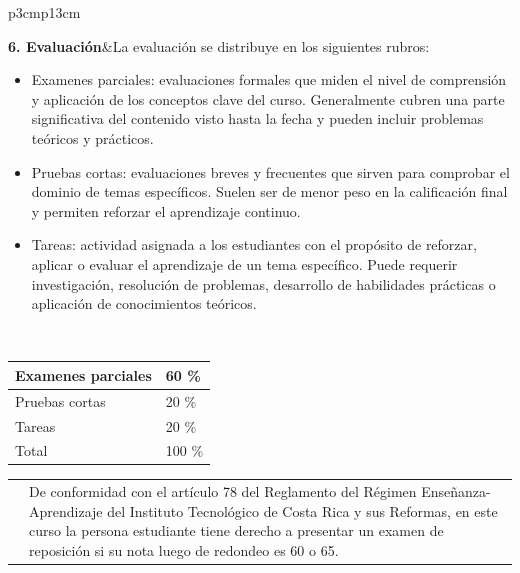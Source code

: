 \documentclass[letterpaper]{article}%
\begin{document}
\vspace*{2mm}%
\newline%
\begin{tabularx}{\textwidth}{p{3cm}p{13cm}}%
\par\fontsize{12}{14}\selectfont \textbf{\textcolor{parte}{6. Evaluación}}&La evaluación se distribuye en los siguientes rubros: \newline \begin{itemize} \item Examenes parciales: evaluaciones formales que miden el nivel de comprensión y aplicación de los conceptos clave del curso. Generalmente cubren una parte significativa del contenido visto hasta la fecha y pueden incluir problemas teóricos y prácticos. \item Pruebas cortas: evaluaciones breves y frecuentes que sirven para comprobar el dominio de temas específicos. Suelen ser de menor peso en la calificación final y permiten reforzar el aprendizaje continuo. \item Tareas: actividad asignada a los estudiantes con el propósito de reforzar, aplicar o evaluar el aprendizaje de un tema específico. Puede requerir investigación, resolución de problemas, desarrollo de habilidades prácticas o aplicación de conocimientos teóricos. \end{itemize}\\%
\end{tabularx}%
\vspace*{2mm}%
\newline%
 \begin{minipage}{\linewidth}  \centering  \begin{tabular}{ p{4cm}  p{1.5cm} }  \toprule  Examenes parciales & 60 \% \\  \midrule  Pruebas cortas & 20 \% \\  \midrule  Tareas & 20 \% \\  \midrule Total & 100 \% \\  \bottomrule  \end{tabular} \end{minipage}%
\vspace*{2mm}%
\newline%
\begin{tabularx}{\textwidth}{p{3cm}p{13cm}}%
&De conformidad con el artículo 78 del Reglamento del Régimen Enseñanza-Aprendizaje del Instituto Tecnológico de Costa Rica y sus Reformas, en este curso la persona estudiante  tiene derecho a presentar un examen de reposición si su nota luego de redondeo es 60 o 65.\\%
\end{tabularx}%
\end{document}

